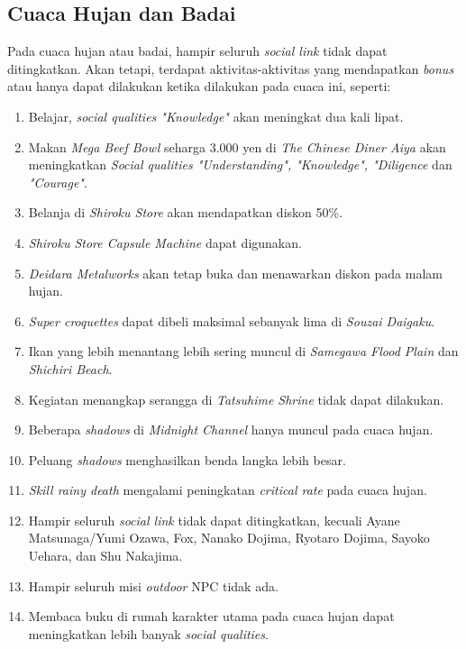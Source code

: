 \subsection{Cuaca Hujan dan Badai}
Pada cuaca hujan atau badai, hampir seluruh \textit{social link} tidak dapat ditingkatkan. Akan tetapi, terdapat aktivitas-aktivitas yang mendapatkan \textit{bonus} atau hanya dapat dilakukan ketika dilakukan pada cuaca ini, seperti:
\begin{enumerate}
    \item Belajar, \textit{social qualities "Knowledge"} akan meningkat dua kali lipat.
    \item Makan \textit{Mega Beef Bowl} seharga 3.000 yen di \textit{The Chinese Diner Aiya} akan meningkatkan \textit{Social qualities "Understanding", "Knowledge", "Diligence} dan \textit{"Courage"}.
    \item Belanja di \textit{Shiroku Store} akan mendapatkan diskon 50\%.
    \item \textit{Shiroku Store Capsule Machine} dapat digunakan.
    \item \textit{Deidara Metalworks} akan tetap buka dan menawarkan diskon pada malam hujan.
    \item \textit{Super croquettes} dapat dibeli maksimal sebanyak lima di \textit{Souzai Daigaku}.
    \item Ikan yang lebih menantang lebih sering muncul di \textit{Samegawa Flood Plain} dan \textit{Shichiri Beach}.
    \item Kegiatan menangkap serangga di \textit{Tatsuhime Shrine} tidak dapat dilakukan.
    \item Beberapa \textit{shadows} di \textit{Midnight Channel} hanya muncul pada cuaca hujan.
    \item Peluang \textit{shadows} menghasilkan benda langka lebih besar.
    \item \textit{Skill rainy death} mengalami peningkatan \textit{critical rate} pada cuaca hujan.
    \item Hampir seluruh \textit{social link} tidak dapat ditingkatkan, kecuali Ayane Matsunaga/Yumi Ozawa, Fox, Nanako Dojima, Ryotaro Dojima, Sayoko Uehara, dan Shu Nakajima.
    \item Hampir seluruh misi \textit{outdoor} NPC tidak ada.
    \item Membaca buku di rumah karakter utama pada cuaca hujan dapat meningkatkan lebih banyak \textit{social qualities}.
\end{enumerate}

